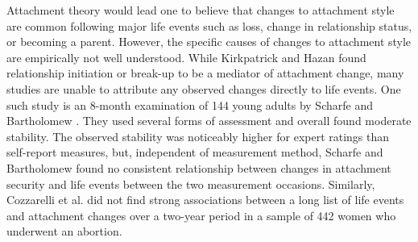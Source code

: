 \documentclass[12pt]{report}
\begin{document}
Attachment theory would lead one to believe that changes to attachment style are common following major life events such as loss, change in relationship status, or becoming a parent.
However, the specific causes of changes to attachment style are empirically not well understood.
While Kirkpatrick and Hazan \cite{Kirkpatrick1994} found relationship initiation or break-up to be a mediator of attachment change, many studies are unable to attribute any observed changes directly to life events.
One such study is an 8-month examination of 144 young adults by Scharfe and Bartholomew \cite{Scharfe1994}.
They used several forms of assessment and overall found moderate stability. The observed stability was noticeably higher for expert ratings than self-report measures, but, independent of measurement method, Scharfe and Bartholomew found no consistent relationship between changes in attachment security and life events between the two measurement occasions.
Similarly, Cozzarelli et al. \cite{Cozzarelli2003} did not find strong associations between a long list of life events and attachment changes over a two-year period in a sample of 442 women who underwent an abortion.
\end{document}
